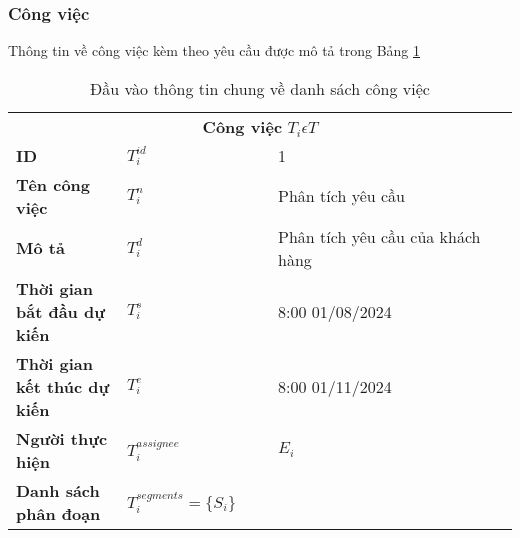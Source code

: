 \documentclass{article}
\begin{document}
\subsubsection{Công việc}
Thông tin về công việc kèm theo yêu cầu được mô tả trong Bảng \ref{tab:table_input_thongtincongviec}
        \begin{table} [htbp]
            \caption{Đầu vào thông tin chung về danh sách công việc}
            \centering
            \begin{tabular}{p{0.22\linewidth} p{0.3\linewidth} p{0.53\linewidth}} 
                \toprule
                \multicolumn{3}{c}{\textbf{Công việc} \textit{$T_{i}\epsilon T$}}\\
                \textbf{ID} & $T_{i}^{id}$ & 1\\ 
                \textbf{Tên công việc} & $T_{i}^n$ & Phân tích yêu cầu\\ 
                \textbf{Mô tả} & $T_{i}^d$ & Phân tích yêu cầu của khách hàng\\ 
                \textbf{Thời gian bắt đầu dự kiến} & $T_{i}^s$ & 8:00 01/08/2024\\ 
                \textbf{Thời gian kết thúc dự kiến} & $T_{i}^e$ & 8:00 01/11/2024\\ 
                \textbf{Người thực hiện} & $T_{i}^{assignee}$ & $E_{i}$\\ 
                \textbf{Danh sách phân đoạn} & $T_{i}^{segments} = \{S_i\}$ & \\ 
                \bottomrule             
            \end{tabular}
            \label{tab:table_input_thongtincongviec}
        \end{table}
\end{document}
